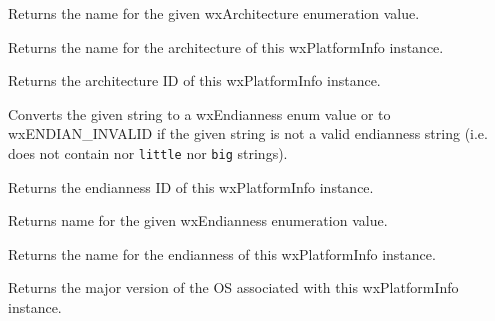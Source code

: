 
Returns the name for the given wxArchitecture enumeration value.


Returns the name for the architecture of this wxPlatformInfo instance.


\label{wxplatforminfogetarchitecture}


Returns the architecture ID of this wxPlatformInfo instance.




\label{wxplatforminfogetendianness}


Converts the given string to a wxEndianness enum value or to
wxENDIAN_INVALID if the given string is not a valid endianness string
(i.e. does not contain nor {\tt little} nor {\tt big} strings).


Returns the endianness ID of this wxPlatformInfo instance.

\label{wxplatforminfogetendiannessname}


Returns name for the given wxEndianness enumeration value.


Returns the name for the endianness of this wxPlatformInfo instance.





\label{wxplatforminfogetosmajorversion}


Returns the major version of the OS associated with this wxPlatformInfo instance.

\label{wxplatforminfogetosminorversion}


